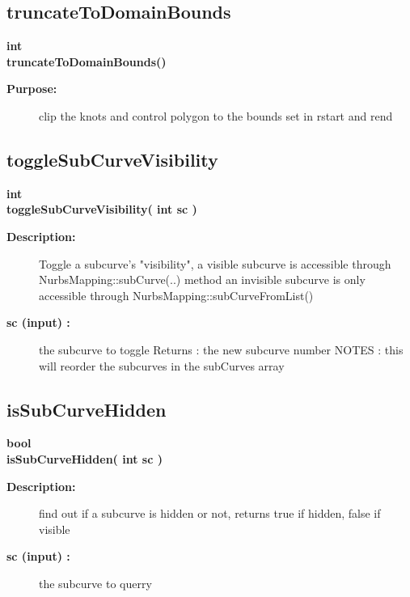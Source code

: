 \subsection{truncateToDomainBounds}
 
\begin{flushleft} \textbf{%
int  \\ 
\settowidth{\NurbsMappingIncludeArgIndent}{truncateToDomainBounds(}%
truncateToDomainBounds()
}\end{flushleft}
\begin{description}
\item[{\bf Purpose:}]  clip the knots and control polygon to the bounds set in rstart and rend
\end{description}
\subsection{toggleSubCurveVisibility}
 
\begin{flushleft} \textbf{%
int  \\ 
\settowidth{\NurbsMappingIncludeArgIndent}{toggleSubCurveVisibility(}%
toggleSubCurveVisibility( int sc )
}\end{flushleft}
\begin{description}
\item[{\bf Description:}] 
   Toggle a subcurve's "visibility", 
      a visible subcurve is accessible through NurbsMapping::subCurve(..) method
    an invisible subcurve is only accessible through NurbsMapping::subCurveFromList()
\item[{\bf sc (input) :}]  the subcurve to toggle
 Returns : the new subcurve number
 NOTES : this will reorder the subcurves in the subCurves array
\end{description}
\subsection{isSubCurveHidden}
 
\begin{flushleft} \textbf{%
bool  \\ 
\settowidth{\NurbsMappingIncludeArgIndent}{isSubCurveHidden(}%
isSubCurveHidden( int sc )
}\end{flushleft}
\begin{description}
\item[{\bf Description:}] 
   find out if a subcurve is hidden or not, returns true if hidden, false if visible
\item[{\bf sc (input) :}]  the subcurve to querry
\end{description}

